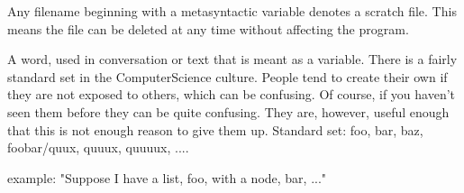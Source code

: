 \documentclass[proposal.tex]{subfiles}
\begin{document}
Any filename beginning with a metasyntactic variable denotes a scratch file. This means the file can be deleted at any time without affecting the program.



\cite{webste:metasyntacticvariablesc2wiki}

A word, used in conversation or text that is meant as a variable. There is a fairly standard set in the ComputerScience culture. People tend to create their own if they are not exposed to others, which can be confusing. Of course, if you haven't seen them before they can be quite confusing. They are, however, useful enough that this is not enough reason to give them up.
Standard set: foo, bar, baz, foobar/quux, quuux, quuuux, ....

example: "Suppose I have a list, foo, with a node, bar, ..."
\end{document}
